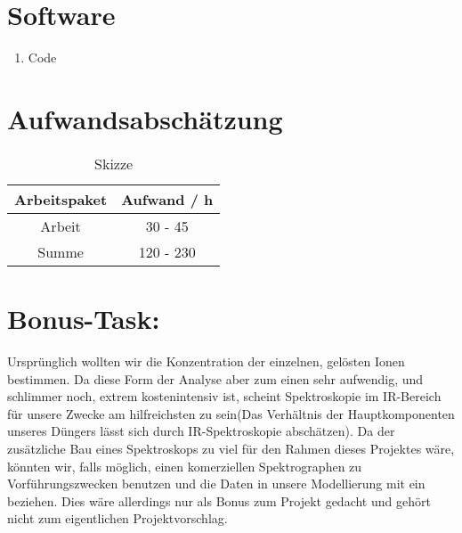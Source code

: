 \section*{Software}
\begin{enumerate}
    \item Code
\end{enumerate}

\section*{Aufwandsabschätzung}
\begin{table}[H]
    \centering
    \caption{
        Skizze
    }
    \begin{tabular}{| c | c |}
        \hline
        Arbeitspaket &  Aufwand / h\\
        \hline
        Arbeit & 30 - 45  \\
        \hline
        \hline
        Summe & 120 - 230  \\
        \hline
    \end{tabular}
    \label{tab:Aufwand}
\end{table}
\section*{Bonus-Task:}
Ursprünglich wollten wir die Konzentration der einzelnen, gelösten Ionen bestimmen.
Da diese Form der Analyse aber zum einen sehr aufwendig, und schlimmer noch, extrem kostenintensiv ist, scheint Spektroskopie im IR-Bereich für unsere Zwecke am hilfreichsten zu sein(Das Verhältnis der Hauptkomponenten unseres Düngers lässt sich durch IR-Spektroskopie abschätzen). Da der zusätzliche Bau eines Spektroskops zu viel für den Rahmen dieses Projektes wäre, könnten wir, falls möglich, einen komerziellen Spektrographen zu Vorführungszwecken benutzen und die Daten in unsere Modellierung mit ein beziehen. Dies wäre allerdings nur als Bonus zum Projekt gedacht und gehört nicht zum eigentlichen Projektvorschlag.

